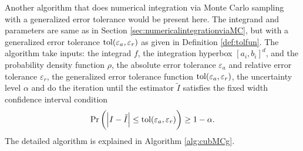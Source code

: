 \documentclass{iitthesis}
\theoremstyle{definition}
\begin{document}
Another algorithm that does numerical integration via Monte Carlo sampling with a generalized error tolerance would be present here. The integrand and parameters are same as in Section \ref{sec:numericalintegrationviaMC}, but with a generalized error tolerance $\operatorname{tol}(\varepsilon_a, \varepsilon_r)$ as given in Definition \ref{def:tolfun}. The algorithm take inputs: the integrad $f$, the integration hyperbox $[a_i,b_i]^d$, and the probability density function $\rho$, the absolute error tolerance $\varepsilon_a$ and relative error tolerance $\varepsilon_r$, the generalized error tolerance function $\operatorname{tol}(\varepsilon_a,\varepsilon_r)$, the uncertainty level $\alpha$ and do the iteration until the estimator $\tilde{I}$ satisfies the fixed width confidence interval condition
\begin{align}\label{cubMCgCI}
\Pr \left(\left \lvert I-\tilde{I} \right \rvert \leq \operatorname{tol}(\varepsilon_a, \varepsilon_r)\right) \geq 1-\alpha.
\end{align}
The detailed algorithm is explained in Algorithm \ref{alg:cubMCg}.
\end{document}
